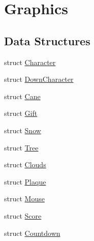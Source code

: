 \hypertarget{group___graphics}{}\section{Graphics}
\label{group___graphics}
\subsection*{Data Structures}
\begin{DoxyCompactItemize}
\item 
struct \hyperlink{struct_character}{Character}
\item 
struct \hyperlink{struct_down_character}{Down\+Character}
\item 
struct \hyperlink{struct_cane}{Cane}
\item 
struct \hyperlink{struct_gift}{Gift}
\item 
struct \hyperlink{struct_snow}{Snow}
\item 
struct \hyperlink{struct_tree}{Tree}
\item 
struct \hyperlink{struct_clouds}{Clouds}
\item 
struct \hyperlink{struct_plaque}{Plaque}
\item 
struct \hyperlink{struct_mouse}{Mouse}
\item 
struct \hyperlink{struct_score}{Score}
\item 
struct \hyperlink{struct_countdown}{Countdown}
\end{DoxyCompactItemize}
